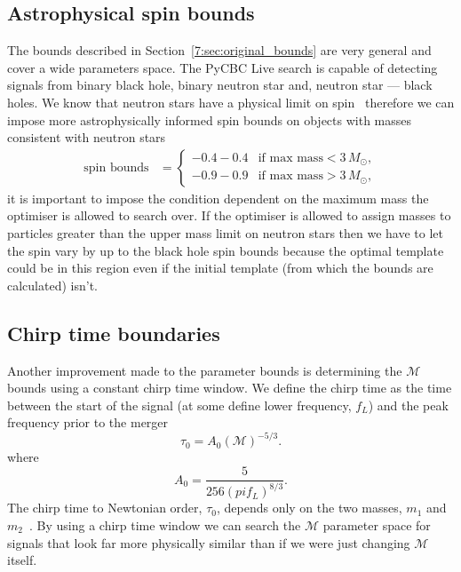 \subsection{Astrophysical spin bounds}

The bounds described in Section~\ref{7:sec:original_bounds} are very general and cover a wide parameters space. The PyCBC Live search is capable of detecting \gwadj signals from binary black hole, binary neutron star and, neutron star — black holes. We know that neutron stars have a physical limit on spin~\cite{Harry_Lundgren:2012} therefore we can impose more astrophysically informed spin bounds on objects with masses consistent with neutron stars
%
\begin{align}
    \text{spin bounds} &= 
    \begin{cases} 
        -0.4 - 0.4 & \text{if } \text{max mass} < 3 \, M_{\odot}, \\
        -0.9 - 0.9 & \text{if } \text{max mass} > 3 \, M_{\odot},
    \end{cases} 
\end{align}
%
it is important to impose the condition dependent on the maximum mass the optimiser is allowed to search over. If the optimiser is allowed to assign masses to particles greater than the upper mass limit on neutron stars then we have to let the spin vary by up to the black hole spin bounds because the optimal template could be in this region even if the initial template (from which the bounds are calculated) isn't.

\subsection{Chirp time boundaries}

Another improvement made to the parameter bounds is determining the $\mathcal{M}$ bounds using a constant chirp time window. We define the chirp time as the time between the start of the signal (at some define lower frequency, $f_{L}$) and the peak frequency prior to the merger
%
\begin{equation}
    \tau_0 = A_{0}\left(\mathcal{M}\right)^{-5/3}.
\end{equation}
%
where
%
\begin{equation}
    A_{0} = \frac{5}{256 \left(pi f_{L}\right)^{8/3}}.
\end{equation}
%
The chirp time to Newtonian order, $\tau_{0}$, depends only on the two masses, $m_{1}$ and $m_{2}$~\cite{Cokelaer:2007}. By using a chirp time window we can search the $\mathcal{M}$ parameter space for signals that look far more physically similar than if we were just changing $\mathcal{M}$ itself.

